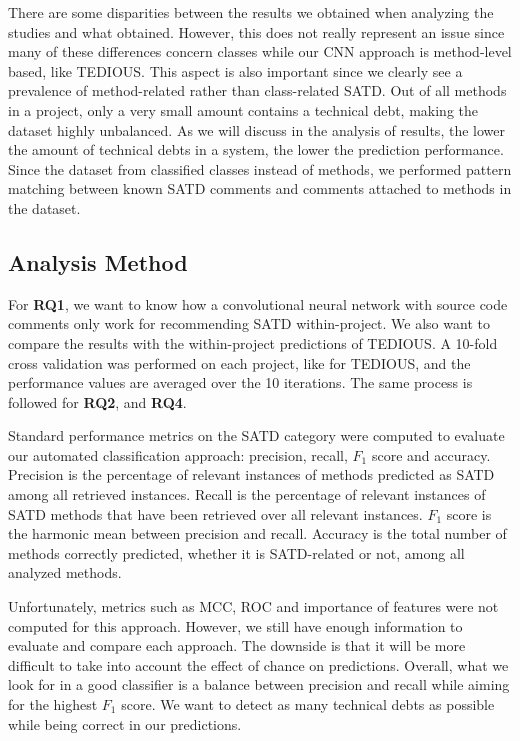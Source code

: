 There are some disparities between the results we obtained when analyzing the studies and what \citet{maldonado17} obtained. However, this does not really represent an issue since many of these differences concern classes while our CNN approach is method-level based, like TEDIOUS. This aspect is also important since we clearly see a prevalence of method-related rather than class-related SATD. Out of all methods in a project, only a very small amount contains a technical debt, making the dataset highly unbalanced. As we will discuss in the analysis of results, the lower the amount of technical debts in a system, the lower the prediction performance. Since the dataset from \citet{maldonado17} classified classes instead of methods, we performed pattern matching between known SATD comments and comments attached to methods in the dataset.

\subsection{Analysis Method}


For \textbf{RQ1}, we want to know how a convolutional neural network with source code comments only work for recommending SATD within-project. We also want to compare the results with the within-project predictions of TEDIOUS. A 10-fold cross validation was performed on each project, like for TEDIOUS, and the performance values are averaged over the 10 iterations. The same process is followed for \textbf{RQ2},  and \textbf{RQ4}.

Standard performance metrics on the SATD category were computed to evaluate our automated classification approach: precision, recall, $F_1$ score and accuracy. Precision is the percentage of relevant instances of methods predicted as SATD among all retrieved instances. Recall is the percentage of relevant instances of SATD methods that have been retrieved over all relevant instances. $F_1$ score is the harmonic mean between precision and recall. Accuracy is the total number of methods correctly predicted, whether it is SATD-related or not, among all analyzed methods. 

Unfortunately, metrics such as MCC, ROC and importance of features were not computed for this approach. However, we still have enough information to evaluate and compare each approach. The downside is that it will be more difficult to take into account the effect of chance on predictions. Overall, what we look for in a good classifier is a balance between precision and recall while aiming for the highest $F_1$ score. We want to detect as many technical debts as possible while being correct in our predictions.

